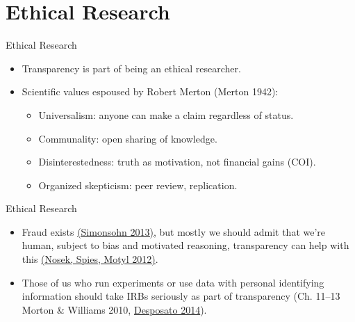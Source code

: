\documentclass{beamer}
\begin{document}
{ %
    \begin{frame}[plain]
     \end{frame}
}
\section{Ethical Research}
\begin{frame}{Ethical Research}
\begin{itemize}
\item Transparency is part of being an ethical researcher. 

\item Scientific values espoused by Robert Merton (Merton 1942):
\begin{itemize}[<.->]
\item Universalism: anyone can make a claim regardless of status.
\item Communality: open sharing of knowledge.
\item Disinterestedness: truth as motivation, not financial gains (COI).
\item Organized skepticism: peer review, replication.
\end{itemize}
\end{itemize}
\end{frame}

\begin{frame}{Ethical Research}
\begin{itemize}
\item
Fraud exists \href{http://pss.sagepub.com/content/24/10/1875}{(Simonsohn 2013)}, but mostly we should admit that we're human, subject to bias and motivated reasoning, transparency can help with this \href{http://pps.sagepub.com/content/7/6/615.short}{(Nosek, Spies, Motyl 2012)}.
\item
Those of us who run experiments or use data with personal identifying information should take IRBs seriously as part of transparency (Ch. 11--13 Morton \& Williams 2010, \href{http://desposato.org/ethicsfieldexperiments.pdf}{Desposato 2014}). 
\end{itemize}
\end{frame}
\end{document}
